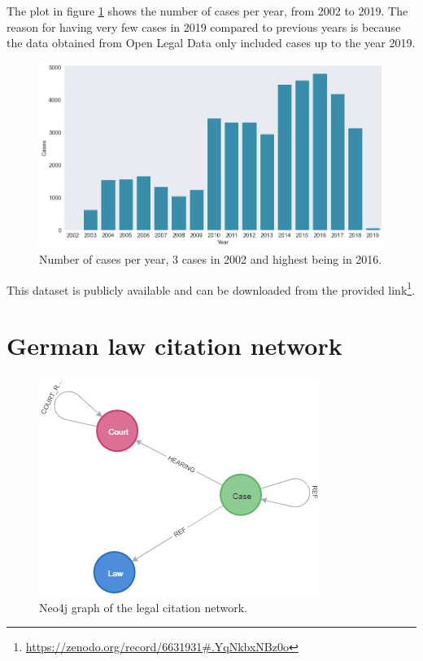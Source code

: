 \documentclass[runningheads]{llncs}
\begin{document}
The plot in figure \ref{fig:case_per_year} shows the number of cases per year, from 2002 to 2019. The reason for having very few cases in 2019 compared to previous years is because the data obtained from Open Legal Data only included cases up to the year 2019.

\begin{figure}[!h]
	\centering
	\includegraphics[width=0.63\linewidth]{images/year_case.png}
	\caption{Number of cases per year, 3 cases in 2002 and highest being in 2016.}
	\label{fig:case_per_year}
\end{figure}

This dataset is publicly available and can be downloaded from the provided link\footnote{\url{https://zenodo.org/record/6631931\#.YqNkbxNBz0o}}.


\section{German law citation network}
\label{sec:law_net}

\begin{figure}
    \centering
    \includegraphics[width=0.5\linewidth]{images/node.png}
   \caption{Neo4j graph of the legal citation network\cite{milz2021analysis}.}
   \label{fig:graph_simple}
\end{figure}
\end{document}
